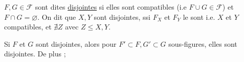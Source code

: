 
 $F,G\in\mathcal F$ sont dites \uline{disjointes} si elles sont compatibles (i.e $F\cup G\in\mathcal F$) et $F\cap G=\varnothing$. On dit que $X,Y$ sont disjointes, ssi $F_X$ et $F_Y$ le sont i.e. $X$ et $Y$ compatibles, et $\nexists Z$ avec $Z\leq X,Y$.

Si $F$ et $G$ sont disjointes, alors pour $F'\subset F,G'\subset G$ sous-figures, elles sont disjointes. De plus ;
